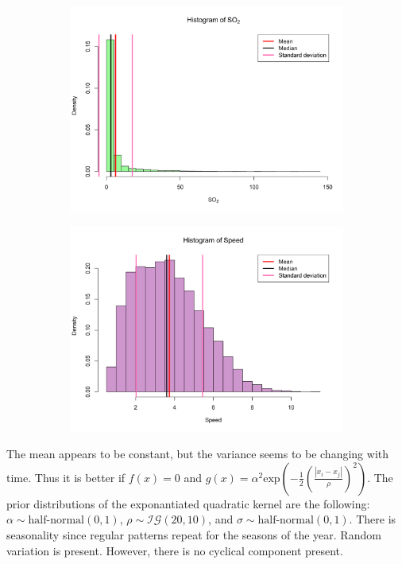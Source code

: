 \documentclass[a4paper, 10pt]{article}
\begin{document}
\begin{flushleft}
\begin{figure}[H]
         \begin{subfigure}[t]{0.48\linewidth}
            \centering
            \includegraphics[width=\linewidth]{../images/so2_hist_2019.png}
         \end{subfigure}
         \hfill
         \begin{subfigure}[t]{0.48\linewidth}
            \centering
            \includegraphics[width=\linewidth]{../images/speed_hist_2019.png}
         \end{subfigure}
      \end{figure}

      The mean appears to be constant, but the variance seems to be changing with time. Thus it is better if $f(x) = 0$ and $g(x) = \alpha^{2} \text{exp}(- \frac{1}{2} (\frac{|x_i - x_j|}{\rho})^2)$. The prior distributions of the exponantiated quadratic kernel are the following: $\alpha \sim \text{half-normal}(0, 1)$, $\rho \sim \mathcal{IG}(20, 10)$, and $\sigma \sim \text{half-normal}(0, 1)$. There is seasonality since regular patterns repeat for the seasons of the year. Random variation is present. However, there is no cyclical component present.
   

\end{flushleft}
\end{document}
